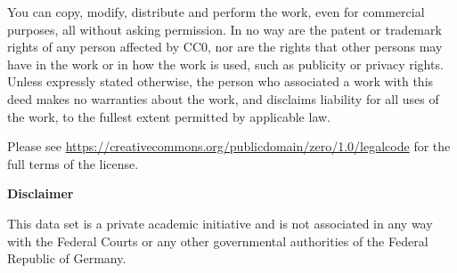 You can copy, modify, distribute and perform the work, even for commercial purposes, all without asking permission. In no way are the patent or trademark rights of any person affected by CC0, nor are the rights that other persons may have in the work or in how the work is used, such as publicity or privacy rights. Unless expressly stated otherwise, the person who associated a work with this deed makes no warranties about the work, and disclaims liability for all uses of the work, to the fullest extent permitted by applicable law. 

Please see \url{https://creativecommons.org/publicdomain/zero/1.0/legalcode} for the full terms of the license.


\vspace{0.5cm}

\textbf{Disclaimer} 

This data set is a private academic initiative and is not associated in any way with the Federal Courts or any other governmental authorities of the Federal Republic of Germany.


\newpage